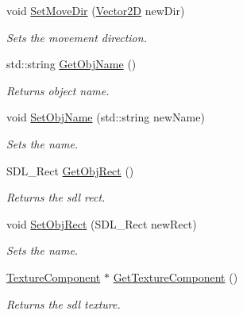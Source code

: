 \begin{DoxyCompactItemize}
void \mbox{\hyperlink{class_game_object_a11c2fa0ca47cbeb27d4887573a913438}{Set\+Move\+Dir}} (\mbox{\hyperlink{struct_vector2_d}{Vector2D}} new\+Dir)
\begin{DoxyCompactList}\small\item\em Sets the movement direction. \end{DoxyCompactList}\item 
\mbox{\label{class_game_object_a8dfeba914fba847488d3bff6e068f7a2}} 
std\+::string \mbox{\hyperlink{class_game_object_a8dfeba914fba847488d3bff6e068f7a2}{Get\+Obj\+Name}} ()
\begin{DoxyCompactList}\small\item\em Returns object name. \end{DoxyCompactList}\item 
void \mbox{\hyperlink{class_game_object_a400594b6957192dfe9cddaa513f49d7e}{Set\+Obj\+Name}} (std\+::string new\+Name)
\begin{DoxyCompactList}\small\item\em Sets the name. \end{DoxyCompactList}\item 
\mbox{\label{class_game_object_a60d86fa7dab47fccf8255760612f6de1}} 
S\+D\+L\+\_\+\+Rect \mbox{\hyperlink{class_game_object_a60d86fa7dab47fccf8255760612f6de1}{Get\+Obj\+Rect}} ()
\begin{DoxyCompactList}\small\item\em Returns the sdl rect. \end{DoxyCompactList}\item 
void \mbox{\hyperlink{class_game_object_a898813cdba2aa0888f6e5b0e4fc6ac64}{Set\+Obj\+Rect}} (S\+D\+L\+\_\+\+Rect new\+Rect)
\begin{DoxyCompactList}\small\item\em Sets the name. \end{DoxyCompactList}\item 
\mbox{\label{class_game_object_a7fcf07003ef5424a7ce46461a8a0be06}} 
\mbox{\hyperlink{struct_texture_component}{Texture\+Component}} $\ast$ \mbox{\hyperlink{class_game_object_a7fcf07003ef5424a7ce46461a8a0be06}{Get\+Texture\+Component}} ()
\begin{DoxyCompactList}\small\item\em Returns the sdl texture. \end{DoxyCompactList}\item 

\end{DoxyCompactItemize}
